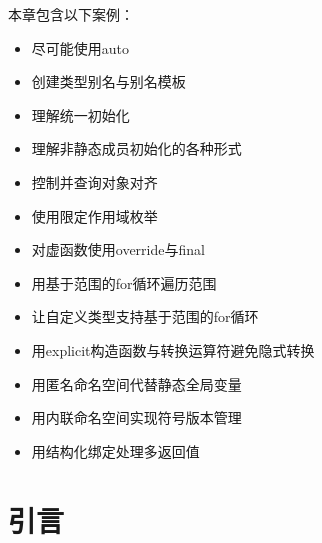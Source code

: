 
本章包含以下案例：



\begin{itemize}
\item 尽可能使用auto



\item 创建类型别名与别名模板



\item 理解统一初始化



\item 理解非静态成员初始化的各种形式



\item 控制并查询对象对齐



\item 使用限定作用域枚举



\item 对虚函数使用override与final



\item 用基于范围的for循环遍历范围



\item 让自定义类型支持基于范围的for循环



\item 用explicit构造函数与转换运算符避免隐式转换



\item 用匿名命名空间代替静态全局变量



\item 用内联命名空间实现符号版本管理



\item 用结构化绑定处理多返回值

\end{itemize}



\section{引言}


